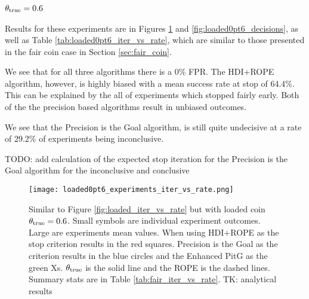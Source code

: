 \subsubsection{$\theta_{\rm true}=0.6$}

Results for these experiments are in Figures \ref{fig:loaded0pt6_iter_vs_rate} and
\ref{fig:loaded0pt6_decisions}, as well as Table \ref{tab:loaded0pt6_iter_vs_rate},
which are similar to those presented in the fair coin case in
Section \ref{sec:fair_coin}.

We see that for all three algorithms there is a 0\% FPR.
The HDI+ROPE algorithm, however, is highly biased with a mean
success rate at stop of 64.4\%. This can be explained by the all of experiments
which stopped fairly early. Both of the the precision based algorithms result in
unbiased outcomes.

We see that the Precision is the Goal algorithm, is still quite undecisive at a rate of 29.2\%
of experiments being inconclusive.

TODO: add calculation of the expected stop iteration for the Precision is the Goal algorithm for the 
inconclusive and conclusive



\begin{figure}[h!]
  \centering
  \texttt{[image: loaded0pt6\_experiments\_iter\_vs\_rate.png]}
  \caption{Similar to Figure \ref{fig:loaded_iter_vs_rate} but with
  loaded coin $\theta_{\rm true}=0.6$.
  Small symbols are individual experiment outcomes. Large are experiments
  mean values. When using HDI+ROPE as the stop criterion results in the red squares.
  Precision is the Goal as the criterion results in the blue circles
  and the Enhanced PitG as the green Xs. $\theta_{\rm true}$ is the solid line and
  the ROPE is the dashed lines. Summary stats are in Table \ref{tab:fair_iter_vs_rate}. TK: analytical results
  }
  \label{fig:loaded0pt6_iter_vs_rate}
\end{figure}



